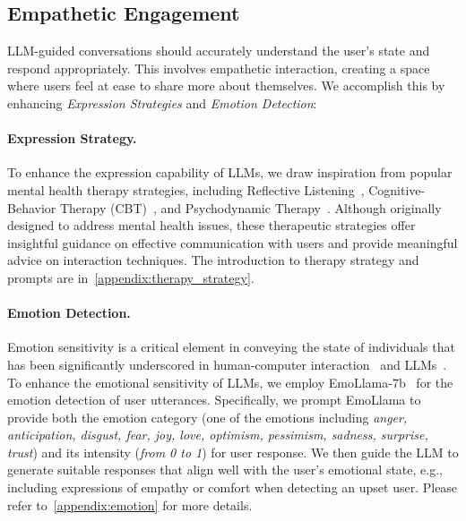 \subsection{Empathetic Engagement}\label{sec:empathetic_engagement}
LLM-guided conversations should accurately understand the user's state and respond appropriately. This involves empathetic interaction, creating a space where users feel at ease to share more about themselves.  We accomplish this by enhancing \textit{Expression Strategies} and \textit{Emotion Detection}:





\paragraph{Expression Strategy.} To enhance the expression capability of LLMs, we draw inspiration from popular mental health therapy strategies, including Reflective Listening~\cite{rautalinko2007reflective}, Cognitive-Behavior Therapy (CBT)~\cite{beck2020cognitive}, and Psychodynamic Therapy~\cite{leichsenring2003effectiveness}. Although originally designed to address mental health issues, these therapeutic strategies offer insightful guidance on effective communication with users and provide meaningful advice on interaction techniques. The introduction to therapy strategy and prompts are in~\cref{appendix:therapy_strategy}.

\paragraph{Emotion Detection.} Emotion sensitivity is a critical element in conveying the state of individuals that has been significantly underscored in human-computer interaction~\cite{cowie2001emotion, brave2007emotion} and LLMs~\cite{li2023large}. 
To enhance the emotional sensitivity of LLMs, we employ EmoLlama-7b~\cite{liu2024emollms} for the emotion detection of user utterances. Specifically, we prompt EmoLlama to provide both the emotion category (one of the emotions including \textit{anger, anticipation, disgust, fear, joy, love, optimism, pessimism, sadness, surprise, trust}) and its intensity (\textit{from 0 to 1}) for user response. We then guide the LLM to generate suitable responses that align well with the user's emotional state, e.g., including expressions of empathy or comfort when detecting an upset user. Please refer to~\cref{appendix:emotion} for more details.

